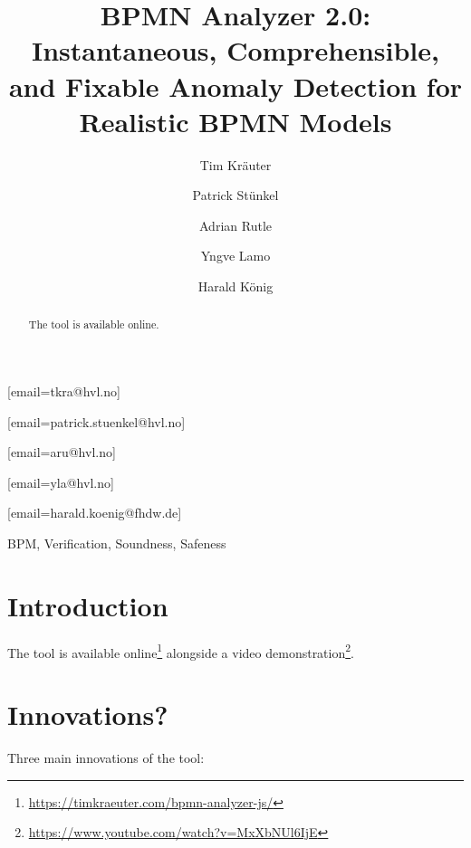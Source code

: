 \documentclass[
twocolumn,
]{ceurart}
\begin{document}


\title{BPMN Analyzer 2.0: Instantaneous, Comprehensible, and Fixable Anomaly Detection for Realistic BPMN Models}

\author[1]{Tim Kräuter}
[email=tkra@hvl.no]
\author[1]{Patrick Stünkel}
[email=patrick.stuenkel@hvl.no]
\author[1]{Adrian Rutle}
[email=aru@hvl.no]
\author[1]{Yngve Lamo}
[email=yla@hvl.no]
\author[2,1]{Harald König}
[email=harald.koenig@fhdw.de]
\address[1]{Western Norway University of Applied Sciences, Bergen, Norway}
\address[2]{FHDW Hannover, Germany}

\begin{abstract}
  The tool is available online.
\end{abstract}

\begin{keywords}
BPM,
Verification,
Soundness,
Safeness
\end{keywords}

\maketitle


\section{Introduction}
The tool is available online\footnote{\url{https://timkraeuter.com/bpmn-analyzer-js/}} alongside a video demonstration\footnote{\url{https://www.youtube.com/watch?v=MxXbNUl6IjE}}.

\section{Innovations?} %
Three main innovations of the tool:
\end{document}

